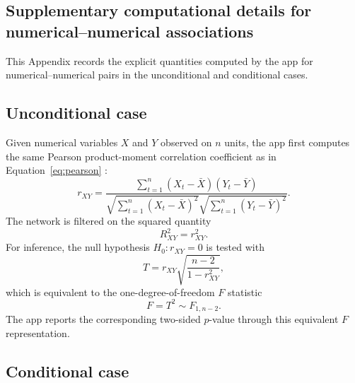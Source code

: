 \documentclass[11pt]{article}
\begin{document}
\newpage

\begin{appendix}

\renewenvironment{equation}{\begin{equation*}}{\end{equation*}}
\renewenvironment{align}{\begin{align*}}{\end{align*}}

\section{Supplementary computational details for numerical--numerical associations}
\label{app:numnum}

This Appendix records the explicit quantities computed by the app for
numerical--numerical pairs in the unconditional and conditional cases.

\subsection{Unconditional case}

Given numerical variables $X$ and $Y$ observed on $n$ units, the app first
computes the same Pearson product-moment correlation coefficient as in
Equation~\eqref{eq:pearson} \citep{Pearson1896}:
\begin{equation}
r_{XY}
=
\frac{
\sum_{t=1}^{n}(X_t - \bar{X})(Y_t - \bar{Y})
}{
\sqrt{\sum_{t=1}^{n}(X_t - \bar{X})^2}
\sqrt{\sum_{t=1}^{n}(Y_t - \bar{Y})^2}
}.
\label{eq:app-pearson}
\end{equation}
The network is filtered on the squared quantity
\begin{equation}
R^2_{XY} = r_{XY}^2.
\label{eq:app-r2}
\end{equation}
For inference, the null hypothesis $H_0: r_{XY} = 0$ is tested with
\begin{equation}
T
=
r_{XY}\sqrt{\frac{n-2}{1-r_{XY}^2}},
\label{eq:app-t-pearson}
\end{equation}
which is equivalent to the one-degree-of-freedom $F$ statistic
\begin{equation}
F = T^2 \sim F_{1,n-2}.
\label{eq:app-f-pearson}
\end{equation}
The app reports the corresponding two-sided $p$-value through this equivalent
$F$ representation.

\subsection{Conditional case}


\end{appendix}
\end{document}
